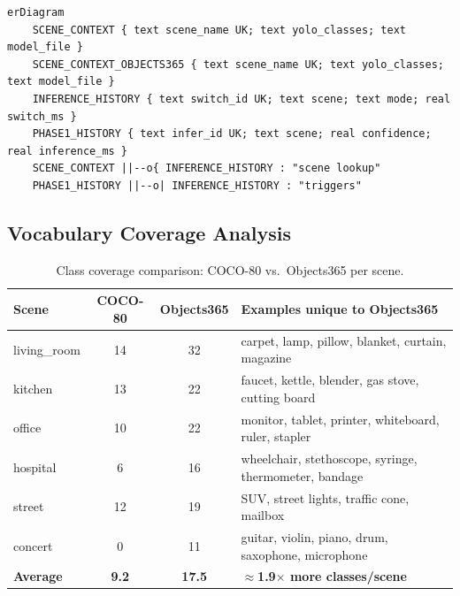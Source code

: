 \documentclass[12pt,a4paper]{article}
\begin{document}
\begin{tcolorbox}[colback=codebg, colframe=dark!30,
    title=Mermaid Source (context\_manager.mmd), fonttitle=\footnotesize\bfseries]
\begin{lstlisting}[style=mermaid]
erDiagram
    SCENE_CONTEXT { text scene_name UK; text yolo_classes; text model_file }
    SCENE_CONTEXT_OBJECTS365 { text scene_name UK; text yolo_classes; text model_file }
    INFERENCE_HISTORY { text switch_id UK; text scene; text mode; real switch_ms }
    PHASE1_HISTORY { text infer_id UK; text scene; real confidence; real inference_ms }
    SCENE_CONTEXT ||--o{ INFERENCE_HISTORY : "scene lookup"
    PHASE1_HISTORY ||--o| INFERENCE_HISTORY : "triggers"
\end{lstlisting}
\end{tcolorbox}

\subsection{Vocabulary Coverage Analysis}

\begin{table}[H]
\centering
\caption{Class coverage comparison: COCO-80 vs.\ Objects365 per scene.}
\label{tab:vocab_coverage}
\begin{tabularx}{\linewidth}{@{}lccX@{}}
\toprule
\textbf{Scene}     & \textbf{COCO-80} & \textbf{Objects365} & \textbf{Examples unique to Objects365} \\
\midrule
living\_room  & 14 & 32 & carpet, lamp, pillow, blanket, curtain, magazine \\
kitchen       & 13 & 22 & faucet, kettle, blender, gas stove, cutting board \\
office        & 10 & 22 & monitor, tablet, printer, whiteboard, ruler, stapler \\
hospital      &  6 & 16 & wheelchair, stethoscope, syringe, thermometer, bandage \\
street        & 12 & 19 & SUV, street lights, traffic cone, mailbox \\
concert       &  0 & 11 & guitar, violin, piano, drum, saxophone, microphone \\
\midrule
\textbf{Average} & \textbf{9.2} & \textbf{17.5} & \textbf{$\approx$1.9$\times$ more classes/scene} \\
\bottomrule
\end{tabularx}
\end{table}
\end{document}
